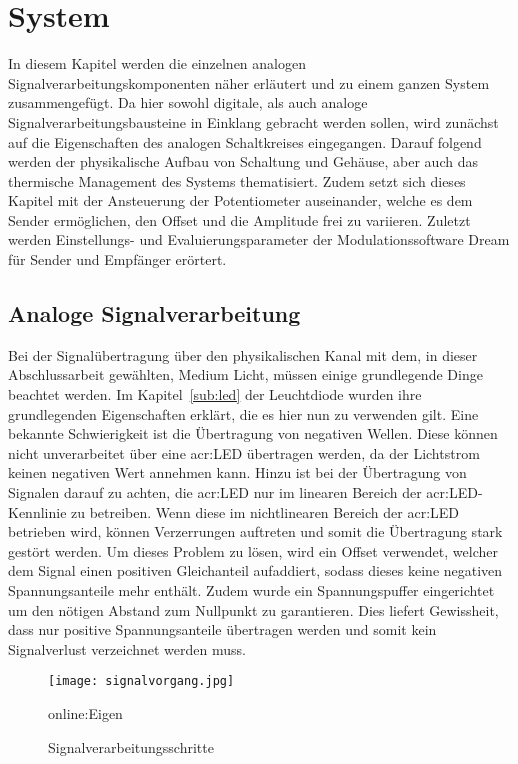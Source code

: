 
\chapter{System}
\label{sec:system}
In diesem Kapitel werden die einzelnen analogen Signalverarbeitungskomponenten näher erläutert und zu einem ganzen System zusammengefügt. Da hier sowohl digitale, als auch analoge Signalverarbeitungsbausteine in Einklang gebracht werden sollen, wird zunächst auf die Eigenschaften des analogen Schaltkreises eingegangen. Darauf folgend werden der physikalische Aufbau von Schaltung und Gehäuse, aber auch das thermische Management des Systems thematisiert. Zudem setzt sich dieses Kapitel mit der Ansteuerung der Potentiometer auseinander, welche es dem Sender ermöglichen, den Offset und die Amplitude frei zu variieren. Zuletzt werden Einstellungs- und Evaluierungsparameter der Modulationssoftware Dream für Sender und Empfänger erörtert.


\section{Analoge Signalverarbeitung}
\label{sec:Signalverarbeitung}
Bei der Signalübertragung über den physikalischen Kanal mit dem, in dieser Abschlussarbeit gewählten, Medium Licht, müssen einige grundlegende Dinge beachtet werden. Im Kapitel~\ref{sub:led} der Leuchtdiode wurden ihre grundlegenden Eigenschaften erklärt, die es hier nun zu verwenden gilt. Eine bekannte Schwierigkeit ist die Übertragung von negativen Wellen. Diese können nicht unverarbeitet über eine \gls{acr:LED} übertragen werden, da der Lichtstrom keinen negativen Wert annehmen kann. Hinzu ist bei der Übertragung von Signalen darauf zu achten, die \gls{acr:LED} nur im linearen Bereich der \gls{acr:LED}-Kennlinie zu betreiben. Wenn diese im nichtlinearen Bereich der \gls{acr:LED} betrieben wird, können Verzerrungen auftreten und somit die Übertragung stark gestört werden. Um dieses Problem zu lösen, wird ein Offset verwendet, welcher dem Signal einen positiven Gleichanteil aufaddiert, sodass dieses keine negativen Spannungsanteile mehr enthält. Zudem wurde ein Spannungspuffer eingerichtet um den nötigen Abstand zum Nullpunkt zu garantieren. Dies liefert Gewissheit, dass nur positive Spannungsanteile übertragen werden und somit kein Signalverlust verzeichnet werden muss.

\begin{figure}[H]
	\centering
	\texttt{[image: signalvorgang.jpg]}
	\caption[Signalverarbeitungsschritte]{Signalverarbeitungsschritte} \gls{online:Eigen}
	\label{fig:signalvorgang}
\end{figure}

